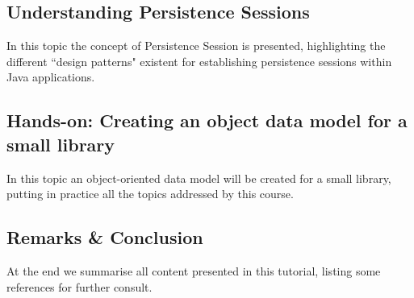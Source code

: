 \documentclass[12pt,a4paper]{article}
\begin{document}
\subsection{Understanding Persistence Sessions}

In this topic the concept of Persistence Session is presented, highlighting the different ``design patterns" existent for establishing persistence sessions within Java applications.

\subsection{Hands-on: Creating an object data model for a small library}

In this topic an object-oriented data model will be created for a small library, putting in practice all the topics addressed by this course.

\subsection{Remarks \& Conclusion}

At the end we summarise all content presented in this tutorial, listing some references for further consult.
\end{document}
